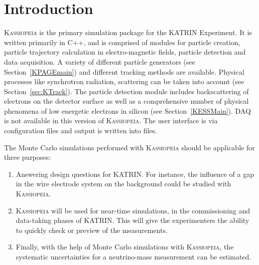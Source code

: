 
\chapter{Introduction}\label{sec:introduction}

\textsc{Kassiopeia} is the primary simulation package for the KATRIN Experiment.  It is written primarily in C++, and is comprised of modules for particle creation, particle trajectory calculation in electro-magnetic fields, particle detection and data acquisition. A variety of different particle generators (see Section~\ref{KPAGEmain}) and different tracking methods are available. Physical processes like synchrotron radiation, scattering can be taken into account (see Section~\ref{sec:KTrack}). The particle detection module includes backscattering of electrons on the detector surface as well as a comprehensive number of physical phenomena of low energetic electrons in silicon (see Section~\ref{KESSMain}). DAQ is not available in this version of \textsc{Kassiopeia}. The user interface is via configuration files and output is written into \cernroot{} files.

The Monte Carlo simulations performed with \textsc{Kassiopeia} should be applicable for three purposes: 
\begin{enumerate}
\item Answering design questions for KATRIN. For instance, the influence of a gap in the wire electrode system on the background could be studied with \textsc{Kassiopeia}.
\item \textsc{Kassiopeia} will be used for near-time simulations, in the commissioning and data-taking phases of KATRIN. This will give the experimenters the ability to quickly check or preview of the measurements.
\item Finally, with the help of Monte Carlo simulations with \textsc{Kassiopeia}, the systematic uncertainties for a neutrino-mass measurement can be estimated.
\end{enumerate}



